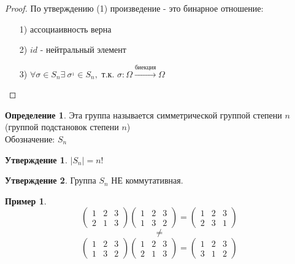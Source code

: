 \documentclass[a4paper, 12pt]{article}
\theoremstyle{definition}
\newtheorem*{definition}{Определение}
\newtheorem*{subtheorem}{Утверждение}
\newtheorem*{example1}{Пример}
\begin{document}
  \begin{proof}
    По утверждению (1) произведение - это бинарное отношение:
    \begin{itemize}
      \item[1)] ассоциаивность верна
      \item[2)] $id$ - нейтральный элемент
      \item[3)] $\forall \sigma \in S_n \exists \ \sigma^{_1} \in S_n, $ т.к. $\sigma: \Omega \overset{\text{биекция}}{\longrightarrow} \Omega$  
    \end{itemize}
  \end{proof} 
  \begin{definition}
    Эта группа называется симметрической группой степени $n$ \\(группой подстановок степени $n$) \\
    Обозначение: $S_n$ 
  \end{definition} 
  \begin{subtheorem}
    $|S_n| = n!$ 
  \end{subtheorem} 
  \begin{subtheorem}
    Группа $S_n$ НЕ коммутативная.
  \end{subtheorem} 
  \begin{example1}
    $$\begin{pmatrix}
      1 & 2 & 3 \\ 2 & 1 & 3
    \end{pmatrix} \begin{pmatrix}
      1 & 2 & 3 \\ 1 & 3 & 2
    \end{pmatrix} = \begin{pmatrix}
      1 & 2 & 3 \\ 2 & 3 & 1
    \end{pmatrix}$$ 
    $$\neq$$ 
    $$\begin{pmatrix}
      1 & 2 & 3 \\ 1 & 3 & 2
    \end{pmatrix} \begin{pmatrix}
      1 & 2 & 3 \\ 2 & 1 & 3
    \end{pmatrix} = \begin{pmatrix}
      1 & 2 & 3 \\ 3 & 1 & 2
    \end{pmatrix}$$ 
  \end{example1}
\end{document}
